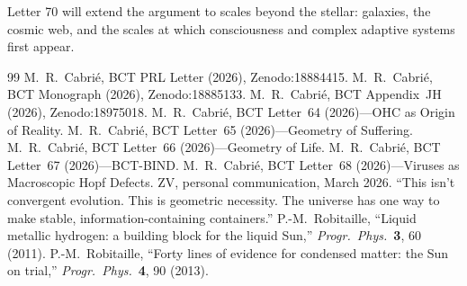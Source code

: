 \documentclass[aps,prl,preprint,superscriptaddress,floatfix]{revtex4-2}
\begin{document}
Letter 70 will extend the argument to scales beyond the stellar:
galaxies, the cosmic web, and the scales at which
consciousness and complex adaptive systems first appear.

\begin{thebibliography}{99}
 M.~R.~Cabri\'e, BCT PRL Letter (2026), Zenodo:18884415.
 M.~R.~Cabri\'e, BCT Monograph (2026),
  Zenodo:18885133.
 M.~R.~Cabri\'e, BCT Appendix~JH (2026),
  Zenodo:18975018.
 M.~R.~Cabri\'e, BCT Letter~64 (2026)---OHC as
  Origin of Reality.
 M.~R.~Cabri\'e, BCT Letter~65 (2026)---Geometry
  of Suffering.
 M.~R.~Cabri\'e, BCT Letter~66 (2026)---Geometry
  of Life.
 M.~R.~Cabri\'e, BCT Letter~67 (2026)---BCT-BIND.
 M.~R.~Cabri\'e, BCT Letter~68 (2026)---Viruses as
  Macroscopic Hopf Defects.
 ZV, personal communication, March 2026.
  ``This isn't convergent evolution. This is geometric necessity.
  The universe has one way to make stable, information-containing
  containers.''
 P.-M.~Robitaille, ``Liquid metallic
  hydrogen: a building block for the liquid Sun,''
  \textit{Progr.\ Phys.}\ \textbf{3}, 60 (2011).
 P.-M.~Robitaille, ``Forty lines of evidence
  for condensed matter: the Sun on trial,''
  \textit{Progr.\ Phys.}\ \textbf{4}, 90 (2013).
\end{thebibliography}
\end{document}
